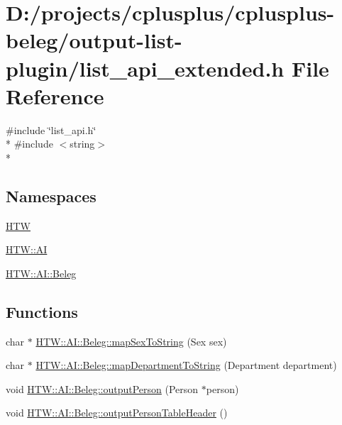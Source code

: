 \hypertarget{output-list-plugin_2list__api__extended_8h}{\section{D\-:/projects/cplusplus/cplusplus-\/beleg/output-\/list-\/plugin/list\-\_\-api\-\_\-extended.h File Reference}
\label{output-list-plugin_2list__api__extended_8h}
}
{\ttfamily \#include \char`\"{}list\-\_\-api.\-h\char`\"{}}\\*
{\ttfamily \#include $<$string$>$}\\*
\subsection*{Namespaces}
\begin{DoxyCompactItemize}
\item 
\hyperlink{namespace_h_t_w}{H\-T\-W}
\item 
\hyperlink{namespace_h_t_w_1_1_a_i}{H\-T\-W\-::\-A\-I}
\item 
\hyperlink{namespace_h_t_w_1_1_a_i_1_1_beleg}{H\-T\-W\-::\-A\-I\-::\-Beleg}
\end{DoxyCompactItemize}
\subsection*{Functions}
\begin{DoxyCompactItemize}
\item 
char $\ast$ \hyperlink{namespace_h_t_w_1_1_a_i_1_1_beleg_aa88237c539d44af6b297104e90f3fe4a}{H\-T\-W\-::\-A\-I\-::\-Beleg\-::map\-Sex\-To\-String} (Sex sex)
\item 
char $\ast$ \hyperlink{namespace_h_t_w_1_1_a_i_1_1_beleg_a71374c8885c328cc86695031048d6f3a}{H\-T\-W\-::\-A\-I\-::\-Beleg\-::map\-Department\-To\-String} (Department department)
\item 
void \hyperlink{namespace_h_t_w_1_1_a_i_1_1_beleg_a0079743a47110e2ebbf1d1c0adc88a4f}{H\-T\-W\-::\-A\-I\-::\-Beleg\-::output\-Person} (Person $\ast$person)
\item 
void \hyperlink{namespace_h_t_w_1_1_a_i_1_1_beleg_a4a69303afeacbd64a2185c148f7b1862}{H\-T\-W\-::\-A\-I\-::\-Beleg\-::output\-Person\-Table\-Header} ()
\end{DoxyCompactItemize}
